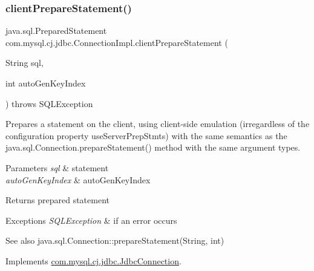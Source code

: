 \subsubsection{\texorpdfstring{client\+Prepare\+Statement()}{clientPrepareStatement()}\hspace{0.1cm}{\footnotesize\ttfamily [2/6]}}
{\footnotesize\ttfamily java.\+sql.\+Prepared\+Statement com.\+mysql.\+cj.\+jdbc.\+Connection\+Impl.\+client\+Prepare\+Statement (\begin{DoxyParamCaption}\item[{String}]{sql,  }\item[{int}]{auto\+Gen\+Key\+Index }\end{DoxyParamCaption}) throws S\+Q\+L\+Exception}

Prepares a statement on the client, using client-\/side emulation (irregardless of the configuration property \textquotesingle{}use\+Server\+Prep\+Stmts\textquotesingle{}) with the same semantics as the java.\+sql.\+Connection.\+prepare\+Statement() method with the same argument types.


\begin{DoxyParams}{Parameters}
{\em sql} & statement \\
\hline
{\em auto\+Gen\+Key\+Index} & auto\+Gen\+Key\+Index \\
\hline
\end{DoxyParams}
\begin{DoxyReturn}{Returns}
prepared statement 
\end{DoxyReturn}

\begin{DoxyExceptions}{Exceptions}
{\em S\+Q\+L\+Exception} & if an error occurs \\
\hline
\end{DoxyExceptions}
\begin{DoxySeeAlso}{See also}
java.\+sql.\+Connection\+::prepare\+Statement(\+String, int) 
\end{DoxySeeAlso}


Implements \mbox{\hyperlink{interfacecom_1_1mysql_1_1cj_1_1jdbc_1_1_jdbc_connection_a1d01e4f2fd60084794906cc9a1c24c24}{com.\+mysql.\+cj.\+jdbc.\+Jdbc\+Connection}}.

\mbox{\label{classcom_1_1mysql_1_1cj_1_1jdbc_1_1_connection_impl_a08e44e57c6c4a70f6d4ea9a71b612b0e}} 
